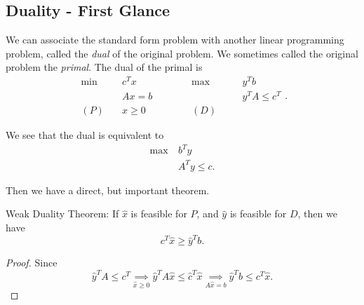 \subsection{Duality - First Glance}
We can associate the standard form problem with another linear programming problem, called the \emph{dual} of the original problem.
We sometimes called the original problem the \emph{primal}. The dual of the primal is
\[
	\begin{alignedat}{5}
		\min~&c^{T}x\qquad\qquad &&\max ~ &&y^{T}b\\
		&Ax = b && &&y^{T}A\leq c^{T}\\
		(P)\quad&x\geq  0 &&(D)\quad&&
	\end{alignedat}.
\]

\begin{note}
	We see that the dual is equivalent to
	\begin{align*}
		\max~ & b^{T}y         \\
		      & A^{T}y \leq c.
	\end{align*}
\end{note}

Then we have a direct, but important theorem.
\begin{theorem}\label{Weak Duality Theorem}
	Weak Duality Theorem: If \(\hat{x}\) is feasible for \(P\), and \(\hat{y}\) is feasible for \(D\), then we have
	\[
		c^{T}\hat{x} \geq  \hat{y}^{T} b.
	\]
\end{theorem}
\begin{proof}
	Since
	\[
		\hat{y}^{T}A\leq c^{T} \underset{\hat{x}\geq 0}{\implies} \hat{y}^{T}A \hat{x} \leq \hat{c}^{T} \hat{x} \underset{A \hat{x} = b}{\implies} \hat{y}^{T}b \leq c^{T} \hat{x}.
	\]
\end{proof}

